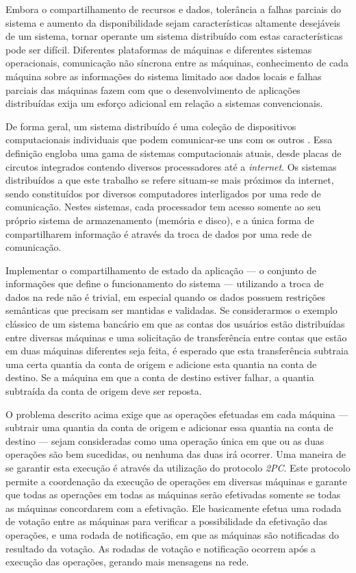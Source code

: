\documentclass[11pt,twoside,a4paper]{book}
\begin{document}
Embora o compartilhamento de recursos e dados, tolerância a falhas parciais do sistema e aumento da disponibilidade sejam características altamente desejáveis de um sistema, tornar operante um sistema distribuído com estas características pode ser difícil. Diferentes plataformas de máquinas e diferentes sistemas operacionais, comunicação não síncrona entre as máquinas, conhecimento de cada máquina sobre as informações do sistema limitado aos dados locais e falhas parciais das máquinas fazem com que o desenvolvimento de aplicações distribuídas exija um esforço adicional em relação a sistemas convencionais.

De forma geral, um sistema distribuído é uma coleção de dispositivos computacionais individuais que podem comunicar-se uns com os outros \cite{tanenbaum}\cite{distributed_computing}. Essa definição engloba uma gama de sistemas computacionais atuais, desde placas de circutos integrados contendo diversos processadores até a \emph{internet}. Os sistemas distribuídos a que este trabalho se refere situam-se mais próximos da internet, sendo constituídos por diversos computadores interligados por uma rede de comunicação. Nestes sistemas, cada processador tem acesso somente ao seu próprio sistema de armazenamento (memória e disco), e a única forma de compartilharem informação é através da troca de dados por uma rede de comunicação.

Implementar o compartilhamento de estado da aplicação --- o conjunto de informações que define o funcionamento do sistema --- utilizando a troca de dados na rede não é trivial, em especial quando os dados possuem restrições semânticas que precisam ser mantidas e validadas. Se considerarmos o exemplo clássico de um sistema bancário em que as contas dos usuários estão distribuídas entre diversas máquinas e uma solicitação de transferência entre contas que estão em duas máquinas diferentes seja feita, é esperado que esta transferência subtraia uma certa quantia da conta de origem e adicione esta quantia na conta de destino. Se a máquina em que a conta de destino estiver falhar, a quantia subtraída da conta de origem deve ser reposta.

O problema descrito acima exige que as operações efetuadas em cada máquina --- subtrair uma quantia da conta de origem e adicionar essa quantia na conta de destino --- sejam consideradas como uma operação única em que ou as duas operações são bem sucedidas, ou nenhuma das duas irá ocorrer. Uma maneira de se garantir esta execução é através da utilização do protocolo \emph{2PC}. Este protocolo permite a coordenação da execução de operações em diversas máquinas e garante que todas as operações em todas as máquinas serão efetivadas somente se todas as máquinas concordarem com a efetivação. Ele basicamente efetua uma rodada de votação entre as máquinas para verificar a possibilidade da efetivação das operações, e uma rodada de notificação, em que as máquinas são notificadas do resultado da votação. As rodadas de votação e notificação ocorrem após a execução das operações, gerando mais mensagens na rede.
\end{document}
